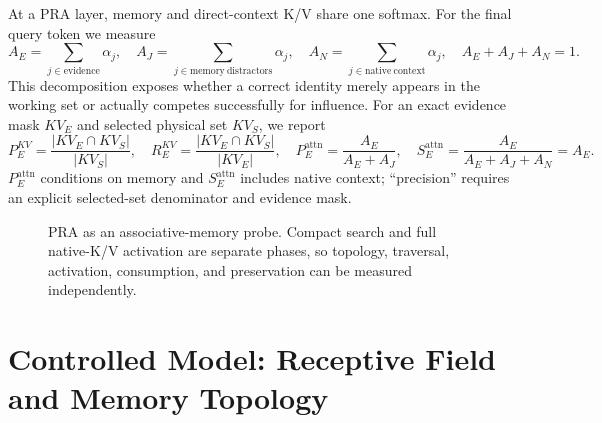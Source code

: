 At a PRA layer, memory and direct-context K/V share one softmax.  For the final query token we measure
\begin{equation}
  A_E=\sum_{j\in\mathrm{evidence}}\alpha_j,\quad
  A_J=\sum_{j\in\mathrm{memory\ distractors}}\alpha_j,\quad
  A_N=\sum_{j\in\mathrm{native\ context}}\alpha_j,\quad
  A_E+A_J+A_N=1.
\end{equation}
This decomposition exposes whether a correct identity merely appears in the working set or actually
competes successfully for influence.
For an exact evidence mask $KV_E$ and selected physical set $KV_S$, we report
\begingroup\small
\begin{equation}
  P_E^{KV}=\frac{|KV_E\cap KV_S|}{|KV_S|},\quad
  R_E^{KV}=\frac{|KV_E\cap KV_S|}{|KV_E|},\quad
  P_E^{\mathrm{attn}}=\frac{A_E}{A_E+A_J},\quad
  S_E^{\mathrm{attn}}=\frac{A_E}{A_E+A_J+A_N}=A_E.
\end{equation}
\endgroup
$P_E^{\mathrm{attn}}$ conditions on memory and $S_E^{\mathrm{attn}}$ includes native context;
``precision'' requires an explicit selected-set denominator and evidence mask.

\begin{figure}[H]
\centering
{}
\caption{PRA as an associative-memory probe.  Compact search and full native-K/V activation are
separate phases, so topology, traversal, activation, consumption, and preservation can be measured
independently.}
\label{fig:pra-probe}
\end{figure}

\section{Controlled Model: Receptive Field and Memory Topology}
\label{sec:controlled-local}

